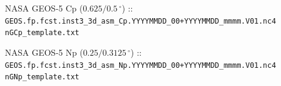 \documentclass[11pt]{article}   %
\begin{document}
NASA GEOS-5 Cp ($0.625/0.5  \, ^{\circ}$) :: \\
\verb|GEOS.fp.fcst.inst3_3d_asm_Cp.YYYYMMDD_00+YYYYMMDD_mmmm.V01.nc4|\\
\verb|nGCp_template.txt| \\
\tiny  \normalsize

NASA GEOS-5 Np ($0.25/0.3125  \, ^{\circ}$) :: \\
\verb|GEOS.fp.fcst.inst3_3d_asm_Np.YYYYMMDD_00+YYYYMMDD_mmmm.V01.nc4|\\
\verb|nGNp_template.txt| \\
\tiny  \normalsize

%
%
%
%
%
%
%
%
%
%
%
\end{document}
